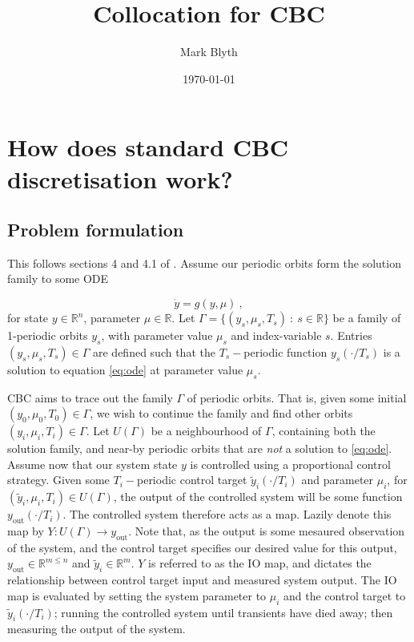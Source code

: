 \documentclass[11pt]{article}
\author{Mark Blyth}
\date{\today}
\title{Collocation for CBC}
\begin{document}
\maketitle

\section{How does standard CBC discretisation work?}
\label{sec:orgd9aabc2}
\subsection{Problem formulation}
\label{sec:org0467025}
This follows sections 4 and 4.1 of \cite{sieber2008control}.
Assume our periodic orbits form the solution family to some ODE

\begin{equation}
\dot{y} = g(y,\mu)~,
\label{eq:ode}
\end{equation}
for state \(y\in\mathbb{R}^n\), parameter \(\mu\in\mathbb{R}\).
Let \(\Gamma=\{(y_s, \mu_s, T_s) ~:~ s\in\mathbb{R}\}\) be a family of 1-periodic orbits \(y_s\), with parameter value \(\mu_s\) and index-variable \(s\).
Entries \((y_s, \mu_s, T_s)\in\Gamma\) are defined such that the \(T_s-\)periodic function \(y_s(\cdot/T_s)\) is a solution to equation \ref{eq:ode} at parameter value \(\mu_s\).

CBC aims to trace out the family \(\Gamma\) of periodic orbits.
That is, given some initial \((y_0, \mu_0, T_0) \in \Gamma\), we wish to continue the family and find other orbits \((y_i, \mu_i, T_i)\in\Gamma\).
Let \(U(\Gamma)\) be a neighbourhood of \(\Gamma\), containing both the solution family, and near-by periodic orbits that are \emph{not} a solution to \ref{eq:ode}.
Assume now that our system state \(y\) is controlled using a proportional control strategy.
Given some \(T_i-\)periodic control target \(\tilde{y}_i(\cdot/T_i)\) and parameter \(\mu_i\), for \((\tilde{y}_i, \mu_i, T_i)\in U(\Gamma)\), the output of the controlled system will be some function \(y_\text{out}(\cdot/T_i)\).
The controlled system therefore acts as a map.
Lazily denote this map by \(Y:U(\Gamma)\to y_\text{out}\).
Note that, as the output is some mesaured observation of the system, and the control target specifies our desired value for this output, \(y_\text{out} \in \mathbb{R}^{m\leq n}\) and \(\tilde{y}_i \in \mathbb{R}^m\).
\(Y\) is referred to as the IO map, and dictates the relationship between control target input and measured system output.
The IO map is evaluated by setting the system parameter to \(\mu_i\) and the control target to \(\tilde{y}_i(\cdot/T_i)\); running the controlled system until transients have died away; then measuring the output of the system.
\end{document}
